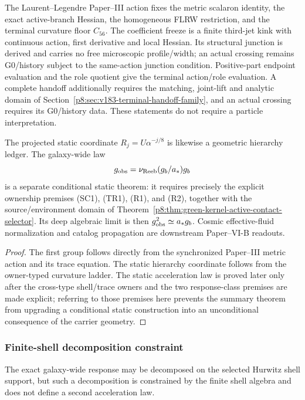 \documentclass[12pt,a4paper]{article}
\begin{document}
\begin{theorem}
\label{p8:thm:scalaron-core-closed}
The Laurent--Legendre Paper--III action fixes the metric scalaron identity,
the exact active-branch Hessian, the homogeneous FLRW restriction, and the
terminal curvature floor \(C_{56}\).  The coefficient freeze is a finite third-jet kink with continuous action, first derivative and local Hessian.  Its structural junction is derived and carries no free
microscopic profile/width; an actual crossing remains G0/history subject to the
same-action junction condition.  Positive-part endpoint evaluation and the
role quotient give the terminal action/role evaluation. A complete handoff additionally requires
the matching, joint-lift and analytic domain of
Section~\ref{p8:sec:v183-terminal-handoff-family}, and an actual crossing
requires its G0/history data.
These statements do not require a particle
interpretation.

The projected static coordinate $R_j=U\alpha^{-j/8}$ is likewise a geometric hierarchy ledger.  The galaxy-wide law
\[
g_{\rm obs}=\nu_{\rm Reeb}(g_b/a_*)g_b
\]
is a separate conditional static theorem: it requires precisely the explicit ownership premises (SC1), (TR1), (R1), and (R2), together with the source/environment domain of Theorem~\ref{p8:thm:green-kernel-active-contact-selector}.  Its deep algebraic limit is then $g_{\rm obs}^2\simeq a_*g_b$.  Cosmic effective-fluid normalization and catalog propagation are downstream Paper--VI-B readouts.
\end{theorem}

\begin{proof}
The first group follows directly from the synchronized Paper--III metric action and its trace equation.  The static hierarchy coordinate follows from the owner-typed curvature ladder.  The static acceleration law is proved later only after the cross-type shell/trace owners and the two response-class premises are made explicit; referring to those premises here prevents the summary theorem from upgrading a conditional static construction into an unconditional consequence of the carrier geometry.
\end{proof}


\subsubsection{Finite-shell decomposition constraint}
\label{p8:sec:finite-shell-decomposition-constraint}
The exact galaxy-wide response may be decomposed on the selected Hurwitz shell support, but such a decomposition is constrained by the finite shell algebra and does not define a second acceleration law.
\end{document}
